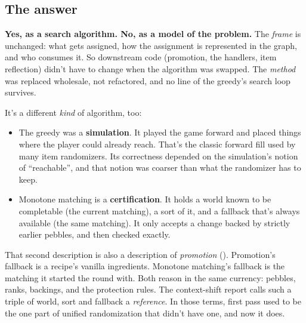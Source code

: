 \subsection{The answer}

\textbf{Yes, as a search algorithm. No, as a model of the problem.} The \emph{frame} is unchanged: what gets assigned, how the assignment is represented in the graph, and who consumes it. So downstream code (promotion, the handlers, item reflection) didn't have to change when the algorithm was swapped. The \emph{method} was replaced wholesale, not refactored, and no line of the greedy's search loop survives.

It's a different \emph{kind} of algorithm, too:

\begin{itemize}
  \item The greedy was a \textbf{simulation}. It played the game forward and placed things where the player could already reach. That's the classic forward fill used by many item randomizers. Its correctness depended on the simulation's notion of ``reachable'', and that notion was coarser than what the randomizer has to keep.
  \item Monotone matching is a \textbf{certification}. It holds a world known to be completable (the current matching), a sort of it, and a fallback that's always available (the same matching). It only accepts a change backed by strictly earlier pebbles, and then checked exactly.
\end{itemize}

\noindent That second description is also a description of \emph{promotion} (). Promotion's fallback is a recipe's vanilla ingredients. Monotone matching's fallback is the matching it started the round with. Both reason in the same currency: pebbles, ranks, backings, and the protection rules. The context-shift report calls such a triple of world, sort and fallback a \emph{reference}. In those terms, first pass used to be the one part of unified randomization that didn't have one, and now it does.

